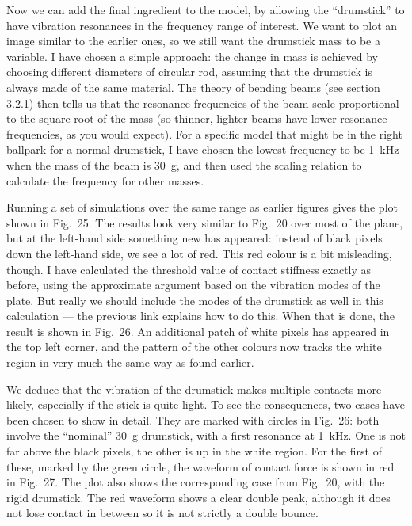   Now we can add the final ingredient to the model, by allowing the “drumstick” 
  to have vibration resonances in the frequency range of interest. We want to 
  plot an image similar to the earlier ones, so we still want the drumstick 
  mass to be a variable. I have chosen a simple approach: the change in mass is 
  achieved by choosing different diameters of circular rod, assuming that the 
  drumstick is always made of the same material. The theory of bending beams 
  (see section 3.2.1) then tells us that the resonance frequencies of the beam 
  scale proportional to the square root of the mass (so thinner, lighter beams 
  have lower resonance frequencies, as you would expect). For a specific model 
  that might be in the right ballpark for a normal drumstick, I have chosen the 
  lowest frequency to be 1~kHz when the mass of the beam is 30~g, and then used 
  the scaling relation to calculate the frequency for other masses. 

  Running a set of simulations over the same range as earlier figures gives the 
  plot shown in Fig.\ 25. The results look very similar to Fig.\ 20 over most 
  of the plane, but at the left-hand side something new has appeared: instead 
  of black pixels down the left-hand side, we see a lot of red. This red colour 
  is a bit misleading, though. I have calculated the threshold value of contact 
  stiffness exactly as before, using the approximate argument based on the 
  vibration modes of the plate. But really we should include the modes of the 
  drumstick as well in this calculation — the previous link explains how to do 
  this. When that is done, the result is shown in Fig.\ 26. An additional patch 
  of white pixels has appeared in the top left corner, and the pattern of the 
  other colours now tracks the white region in very much the same way as found 
  earlier. 

  We deduce that the vibration of the drumstick makes multiple contacts more 
  likely, especially if the stick is quite light. To see the consequences, two 
  cases have been chosen to show in detail. They are marked with circles in 
  Fig.\ 26: both involve the “nominal” 30~g drumstick, with a first resonance 
  at 1~kHz. One is not far above the black pixels, the other is up in the white 
  region. For the first of these, marked by the green circle, the waveform of 
  contact force is shown in red in Fig.\ 27. The plot also shows the 
  corresponding case from Fig.\ 20, with the rigid drumstick. The red waveform 
  shows a clear double peak, although it does not lose contact in between so it 
  is not strictly a double bounce. 

